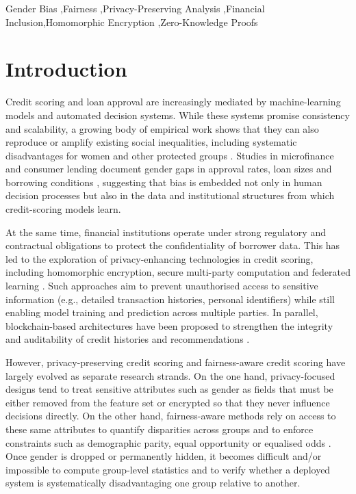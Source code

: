 \documentclass[a4paper,fleqn]{cas-dc}
\begin{document}
\begin{keywords}

Gender Bias \sep Fairness \sep Privacy-Preserving Analysis \sep Financial Inclusion\sep Homomorphic Encryption \sep Zero-Knowledge Proofs

\end{keywords}

\maketitle

\section{Introduction}
Credit scoring and loan approval are increasingly mediated by machine-learning models and automated decision systems. While these systems promise consistency and scalability, a growing body of empirical work shows that they can also reproduce or amplify existing social inequalities, including systematic disadvantages for women and other protected groups \cite{dobbie2021measuring, meshram2022transformative}. Studies in microfinance and consumer lending document gender gaps in approval rates, loan sizes and borrowing conditions \cite{agier2013microfinance, baland2019socially, montoya2020discriminacion, WEFund2015, okoth2013effect}, suggesting that bias is embedded not only in human decision processes but also in the data and institutional structures from which credit-scoring models learn.

At the same time, financial institutions operate under strong regulatory and contractual obligations to protect the confidentiality of borrower data. This has led to the exploration of privacy-enhancing technologies in credit scoring, including homomorphic encryption, secure multi-party computation and federated learning \cite{Yang2022privacy, qiao2023pevachain, he2023privacy}. Such approaches aim to prevent unauthorised access to sensitive information (e.g., detailed transaction histories, personal identifiers) while still enabling model training and prediction across multiple parties. In parallel, blockchain-based architectures have been proposed to strengthen the integrity and auditability of credit histories and recommendations \cite{Patel2020kirti, qiao2023pevachain}.

However, privacy-preserving credit scoring and fairness-aware credit scoring have largely evolved as separate research strands. On the one hand, privacy-focused designs tend to treat sensitive attributes such as gender as fields that must be either removed from the feature set or encrypted so that they never influence decisions directly. On the other hand, fairness-aware methods rely on access to these same attributes to quantify disparities across groups and to enforce constraints such as demographic parity, equal opportunity or equalised odds \cite{hardt2016equality, corrales2021review, moldovan2023algorithmic}. Once gender is dropped or permanently hidden, it becomes difficult and/or impossible to compute group-level statistics and to verify whether a deployed system is systematically disadvantaging one group relative to another.
\end{document}
